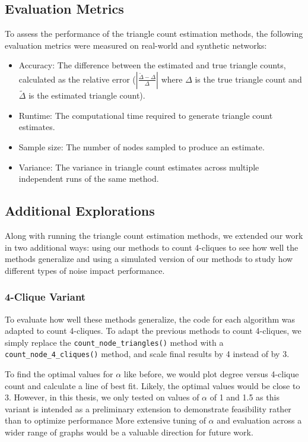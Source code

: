 \documentclass[11pt, margin=1in]{article}
\begin{document}
\subsection{Evaluation Metrics}

To assess the performance of the triangle count estimation methods, the following evaluation metrics were measured on real-world and synthetic networks:

\begin{itemize}
\item Accuracy: The difference between the estimated and true triangle counts, calculated as the relative error ($|\frac{\tilde{\Delta} - \Delta}{\Delta}|$ where $\Delta$ is the true triangle count and $\tilde{\Delta}$ is the estimated triangle count).
\item Runtime: The computational time required to generate triangle count estimates.
\item Sample size: The number of nodes sampled to produce an estimate.
\item Variance: The variance in triangle count estimates across multiple independent runs of the same method.
\end{itemize}

\subsection{Additional Explorations}

Along with running the triangle count estimation methods, we extended our work in two additional ways: using our methods to count 4-cliques to see how well the methods generalize and using a simulated version of our methods to study how different types of noise impact performance.

\subsubsection{4-Clique Variant}

To evaluate how well these methods generalize, the code for each algorithm was adapted to count 4-cliques.
To adapt the previous methods to count 4-cliques, we simply replace the \lstinline{count_node_triangles()} method with a \lstinline{count_node_4_cliques()} method, and scale final results by 4 instead of by 3.

To find the optimal values for $\alpha$ like before, we would plot degree versus 4-clique count and calculate a line of best fit.
Likely, the optimal values would be close to 3.
However, in this thesis, we only tested on values of $\alpha$ of 1 and 1.5 as this variant is intended as a preliminary extension to demonstrate feasibility rather than to optimize performance
More extensive tuning of $\alpha$ and evaluation across a wider range of graphs would be a valuable direction for future work.
\end{document}
